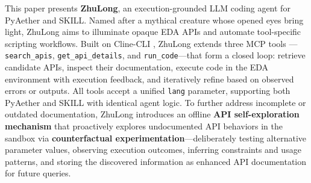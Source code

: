 This paper presents \textbf{ZhuLong}, an execution-grounded LLM coding agent for PyAether and SKILL. Named after a mythical creature whose opened eyes bring light, ZhuLong aims to illuminate opaque EDA APIs and automate tool-specific scripting workflows. Built on Cline-CLI \cite{cline2024cline}, ZhuLong extends three MCP tools \cite{lee2025autoeda}—\texttt{search\_apis}, \texttt{get\_api\_details}, and \texttt{run\_code}—that form a closed loop: retrieve candidate APIs, inspect their documentation, execute code in the EDA environment with execution feedback, and iteratively refine based on observed errors or outputs. All tools accept a unified \texttt{lang} parameter, supporting both PyAether and SKILL with identical agent logic. To further address incomplete or outdated documentation, ZhuLong introduces an offline \textbf{API self-exploration mechanism} that proactively explores undocumented API behaviors in the sandbox via \textbf{counterfactual experimentation}—deliberately testing alternative parameter values, observing execution outcomes, inferring constraints and usage patterns, and storing the discovered information as enhanced API documentation for future queries.

